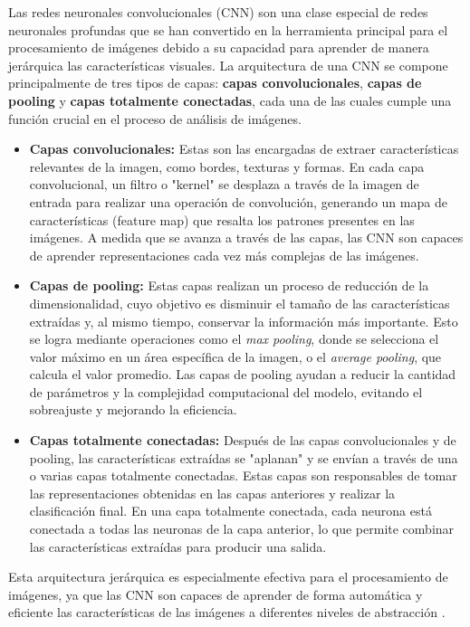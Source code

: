 Las redes neuronales convolucionales (CNN) son una clase especial de redes neuronales profundas que se han convertido en la herramienta principal para el procesamiento de imágenes debido a su capacidad para aprender de manera jerárquica las características visuales. La arquitectura de una CNN se compone principalmente de tres tipos de capas: \textbf{capas convolucionales}, \textbf{capas de pooling} y \textbf{capas totalmente conectadas}, cada una de las cuales cumple una función crucial en el proceso de análisis de imágenes.

\begin{itemize}
    \item \textbf{Capas convolucionales:} Estas son las encargadas de extraer características relevantes de la imagen, como bordes, texturas y formas. En cada capa convolucional, un filtro o "kernel" se desplaza a través de la imagen de entrada para realizar una operación de convolución, generando un mapa de características (feature map) que resalta los patrones presentes en las imágenes. A medida que se avanza a través de las capas, las CNN son capaces de aprender representaciones cada vez más complejas de las imágenes.
    
    \item \textbf{Capas de pooling:} Estas capas realizan un proceso de reducción de la dimensionalidad, cuyo objetivo es disminuir el tamaño de las características extraídas y, al mismo tiempo, conservar la información más importante. Esto se logra mediante operaciones como el \textit{max pooling}, donde se selecciona el valor máximo en un área específica de la imagen, o el \textit{average pooling}, que calcula el valor promedio. Las capas de pooling ayudan a reducir la cantidad de parámetros y la complejidad computacional del modelo, evitando el sobreajuste y mejorando la eficiencia.
    
    \item \textbf{Capas totalmente conectadas:} Después de las capas convolucionales y de pooling, las características extraídas se "aplanan" y se envían a través de una o varias capas totalmente conectadas. Estas capas son responsables de tomar las representaciones obtenidas en las capas anteriores y realizar la clasificación final. En una capa totalmente conectada, cada neurona está conectada a todas las neuronas de la capa anterior, lo que permite combinar las características extraídas para producir una salida.
\end{itemize}

Esta arquitectura jerárquica es especialmente efectiva para el procesamiento de imágenes, ya que las CNN son capaces de aprender de forma automática y eficiente las características de las imágenes a diferentes niveles de abstracción \cite{krizhevsky2012}.

